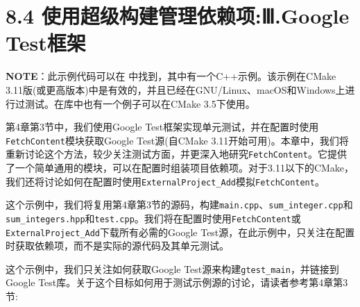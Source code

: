 \section{8.4 使用超级构建管理依赖项:Ⅲ.Google Test框架}

\begin{myInfoBox}
\textbf{NOTE}：此示例代码可以在  中找到，其中有一个C++示例。该示例在CMake 3.11版(或更高版本)中是有效的，并且已经在GNU/Linux、macOS和Windows上进行过测试。在库中也有一个例子可以在CMake 3.5下使用。
\end{myInfoBox}

第4章第3节中，我们使用Google Test框架实现单元测试，并在配置时使用\texttt{FetchContent}模块获取Google Test源(自CMake 3.11开始可用)。本章中，我们将重新讨论这个方法，较少关注测试方面，并更深入地研究\texttt{FetchContent}。它提供了一个简单通用的模块，可以在配置时组装项目依赖项。对于3.11以下的CMake，我们还将讨论如何在配置时使用\texttt{ExternalProject\_Add}模拟\texttt{FetchContent}。


这个示例中，我们将复用第4章第3节的源码，构建\texttt{main.cpp}、\texttt{sum\_integer.cpp}和\texttt{sum\_integers.hpp}和\texttt{test.cpp}。我们将在配置时使用\texttt{FetchContent}或\texttt{ExternalProject\_Add}下载所有必需的Google Test源，在此示例中，只关注在配置时获取依赖项，而不是实际的源代码及其单元测试。


这个示例中，我们只关注如何获取Google Test源来构建\texttt{gtest\_main}，并链接到Google Test库。关于这个目标如何用于测试示例源的讨论，请读者参考第4章第3节:

